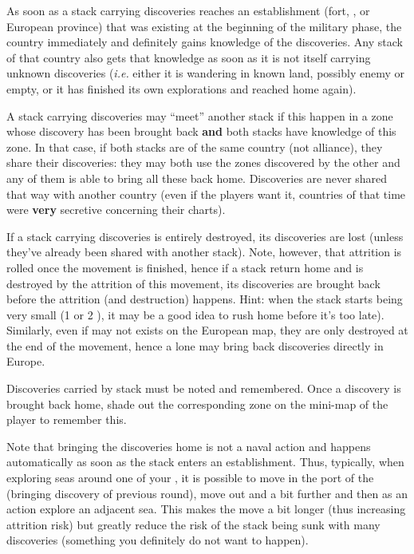 As soon as a stack carrying discoveries reaches an establishment (fort, \TP,
\COL or European province) that was existing at the beginning of the military
phase, the country immediately and definitely gains knowledge of the
discoveries. Any stack of that country also gets that knowledge as soon as it
is not itself carrying unknown discoveries (\emph{i.e.} either it is wandering
in known land, possibly enemy or empty, or it has finished its own
explorations and reached home again).

A stack carrying discoveries may ``meet'' another stack if this happen in a
zone whose discovery has been brought back \textbf{and} both stacks have
knowledge of this zone. In that case, if both stacks are of the same country
(not alliance), they share their discoveries: they may both use the zones
discovered by the other and any of them is able to bring all these back
home. Discoveries are never shared that way with another country (even if the
players want it, countries of that time were \textbf{very} secretive
concerning their charts).

If a stack carrying discoveries is entirely destroyed, its discoveries are
lost (unless they've already been shared with another stack). Note, however,
that attrition is rolled once the movement is finished, hence if a stack
return home and is destroyed by the attrition of this movement, its
discoveries are brought back before the attrition (and destruction)
happens. Hint: when the stack starts being very small (1 or 2 \NDE), it may be
a good idea to rush home before it's too late). Similarly, even if \LDE may
not exists on the European map, they are only destroyed at the end of the
movement, hence a lone \LDE may bring back discoveries directly in Europe.

Discoveries carried by stack must be noted and remembered. Once a discovery is
brought back home, shade out the corresponding zone on the mini-map of the
player to remember this.

Note that bringing the discoveries home is not a naval action and happens
automatically as soon as the stack enters an establishment. Thus, typically,
when exploring seas around one of your \COL, it is possible to move in the
port of the \COL (bringing discovery of previous round), move out and a bit
further and then as an action explore an adjacent sea. This makes the move a
bit longer (thus increasing attrition risk) but greatly reduce the risk of the
stack being sunk with many discoveries (something you definitely do not want
to happen).

